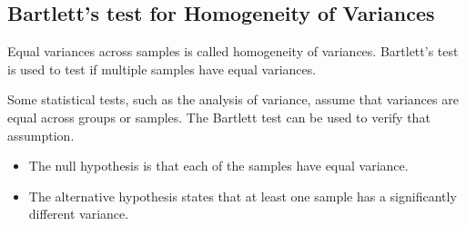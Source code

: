 \documentclass[a4paper,12pt]{article}
\begin{document}
\subsection{Bartlett's test for Homogeneity of Variances}
 

Equal variances across samples is called homogeneity of variances. Bartlett's test is used to test if multiple samples have equal variances. 

Some statistical tests, such as the analysis of variance, assume that variances are equal across groups or samples.  The Bartlett test can be used to verify that assumption.

\begin{itemize}
\item The null hypothesis is that each of the samples have equal variance.
\item The alternative hypothesis states that at least one sample has a significantly different variance.
\end{itemize}

\end{document}
